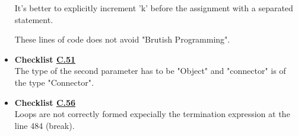\documentclass[../../../../codeInspection.tex]{subfiles}
\begin{document}
\begin{itemize}
		          

		          It's better to explicitly increment 'k' before the assignment with a separated statement.

		          These lines of code does not avoid "Brutish Programming".

		    \item \textbf{Checklist \hyperref[C:51]{C.51}} \\

		    	  

		    	  The type of the second parameter has to be "Object" and "connector" is of the type "Connector".

		    \item \textbf{Checklist \hyperref[C:56]{C.56}} \\

		    	  

		    	  Loops are not correctly formed expecially the termination expression at the line 484 (break).

		\end{itemize}
\end{document}
